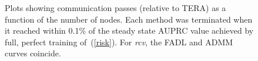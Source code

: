 \documentclass[twoside, 11pt]{article}
\begin{document}
\begin{figure}[H]

\caption{Plots showing communication passes (relative to TERA) as a function of the number of nodes. Each method was terminated when it reached within 0.1\% of the steady state AUPRC value achieved by full, perfect training of~(\ref{risk}). For {\it rcv}, the FADL and ADMM curves coincide.}
\label{fig:auprcpass}
\end{figure}
\end{document}
